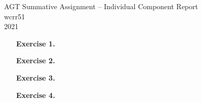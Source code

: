 \documentclass{article}
\begin{document}
	\begin{center}
		\LARGE{AGT Summative Assignment -- Individual Component Report}\\[0.1cm]
		\Large{wcrr51}\\[0.1cm]
		2021\\[0.5cm]
	\end{center}

	\begin{enumerate}

		\item[\textbf{Exercise 1.}]   %
		
		\newpage


		\item[\textbf{Exercise 2.}]   %
		
		\newpage


		\item[\textbf{Exercise 3.}]   %
		
		\newpage


		\item[\textbf{Exercise 4.}]   %
		

	\end{enumerate}
\end{document}
